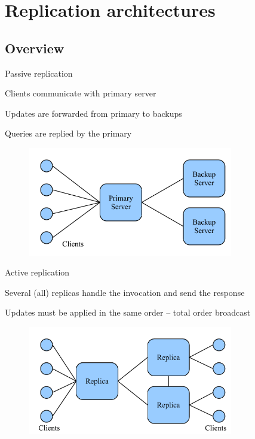 \section{Replication architectures}

\subsection{Overview}


\begin{frame}{Passive replication}
\BI
\item Clients communicate with primary server
\item Updates are forwarded from primary to backups
\item Queries are replied by the primary	
\EI

\begin{figure}
	\includegraphics[width=0.8\textwidth]{figs/09/primarybackup}
\end{figure}

\end{frame}

\begin{frame}{Active replication}
\BI
\item Several (all) replicas handle the invocation and send the response
\item Updates must be applied in the same order – total order broadcast 
\EI
\begin{figure}
	\includegraphics[width=0.8\textwidth]{figs/09/active}
\end{figure}

\end{frame}

